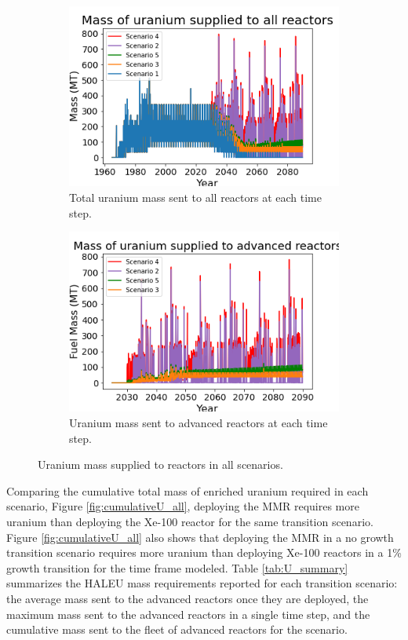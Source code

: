 \begin{figure}
    \centering
    \begin{subfigure}{0.45\textwidth}
        \centering
        \includegraphics[scale=0.4]{../figures/fuelsupply_scenarios_all.png}
        \caption{Total uranium mass sent to all reactors at each time step.}
        \label{fig:totalfuel_all}
    \end{subfigure}
    \hspace{0.8cm}
    \begin{subfigure}{0.45\textwidth}
        \centering
        \includegraphics[scale=0.4]{../figures/advancedRX_fuelsupply_scenarios_2-5.png}
        \caption{Uranium mass sent to advanced reactors at each time step.}
        \label{fig:haleufuel_all}
    \end{subfigure}
    \caption{Uranium mass supplied to reactors in all scenarios.}
    \label{fig:fuel_all}
\end{figure}

Comparing the cumulative total mass of enriched uranium required in each scenario, 
Figure \ref{fig:cumulativeU_all}, deploying the \gls{MMR} 
requires more uranium than deploying the Xe-100 reactor for the same 
transition scenario. Figure \ref{fig:cumulativeU_all} also shows that 
deploying the \gls{MMR} in a no growth transition 
scenario requires more uranium than deploying Xe-100 reactors in a 1\% 
growth transition for the time frame modeled. Table \ref{tab:U_summary} summarizes 
the \gls{HALEU} mass 
requirements reported for each transition scenario: the average mass sent to 
the advanced reactors once they are deployed, the maximum mass sent to the 
advanced reactors in a single time step, and the cumulative mass sent to the 
fleet of advanced reactors for the scenario. 

